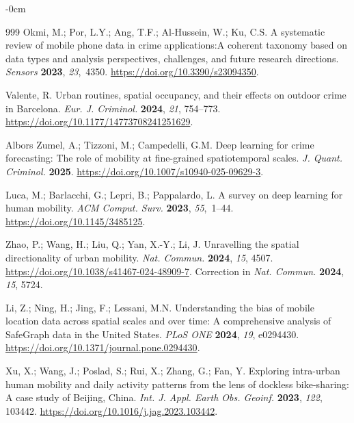 \documentclass[applsci,article,accept,moreauthors]{Definitions/mdpi}
\def\hl#1{#1}%
\begin{document}
\begin{adjustwidth}{-\extralength}{0cm}
\begin{thebibliography}{999}
Okmi, M.; Por, L.Y.; Ang, T.F.; Al-Hussein, W.; Ku, C.S. A systematic review of mobile phone data in crime applications:\linebreak A coherent taxonomy based on data types and analysis perspectives, challenges, and future research directions. \emph{Sensors} \textbf{2023}, \emph{23},~4350. \url{https://doi.org/10.3390/s23094350}.

Valente, R. Urban routines, spatial occupancy, and their effects on outdoor crime in Barcelona. \emph{Eur. J. Criminol.} \textbf{2024}, \emph{21}, 754--773. \url{https://doi.org/10.1177/14773708241251629}.

Albors Zumel, A.; Tizzoni, M.; Campedelli, G.M. Deep learning for crime forecasting: The role of mobility at fine-grained spatiotemporal scales. \emph{J. Quant. Criminol.} \textbf{2025}. \url{https://doi.org/10.1007/s10940-025-09629-3}.

Luca, M.; Barlacchi, G.; Lepri, B.; Pappalardo, L. A survey on deep learning for human mobility. \emph{ACM Comput. Surv.} \textbf{2023}, \emph{55},~1--44. \url{https://doi.org/10.1145/3485125}.

Zhao, P.; Wang, H.; Liu, Q.; Yan, X.-Y.; Li, J. Unravelling the spatial directionality of urban mobility. \emph{Nat. Commun.} \textbf{2024}, \emph{15}, 4507. \url{https://doi.org/10.1038/s41467-024-48909-7}. \hl{Correction in \emph{Nat. Commun.} \textbf{2024}, \textit{15}, 5724.}%

Li, Z.; Ning, H.; Jing, F.; Lessani, M.N. Understanding the bias of mobile location data across spatial scales and over time: A comprehensive analysis of SafeGraph data in the United States. \emph{PLoS ONE} \textbf{2024}, \emph{19}, e0294430. \url{https://doi.org/10.1371/journal.pone.0294430}.

Xu, X.; Wang, J.; Poslad, S.; Rui, X.; Zhang, G.; Fan, Y. Exploring
intra-urban human mobility and daily activity patterns from the lens of
dockless bike-sharing: A case study of Beijing, China.
\emph{Int. J. Appl. Earth Obs. Geoinf.} \textbf{2023}, \emph{122}, 103442.
\url{https://doi.org/10.1016/j.jag.2023.103442}.


\end{thebibliography}
\end{adjustwidth}
\end{document}
